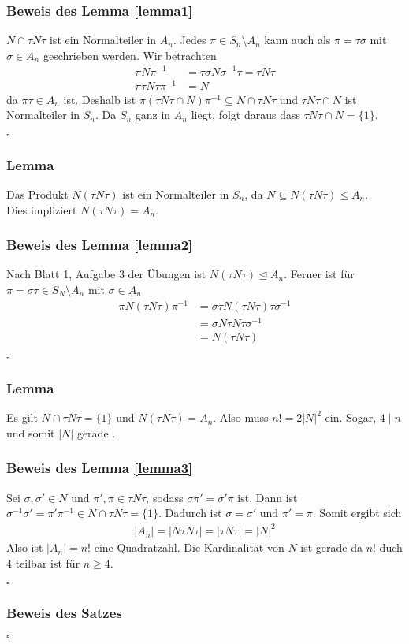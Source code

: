 \documentclass[12pt, german]{article}
\newcommand{\bewiesen}{

\begin{flushright}
		$\square$  \\
\end{flushright}}
\begin{document}
\subsubsection{Beweis des Lemma \ref{lemma1}}
		$N \cap \tau N \tau$ ist ein Normalteiler in $A_n$. Jedes $\pi \in S_n \setminus A_n$ kann auch als $\pi = \tau\sigma$ mit $\sigma \in A_n$ geschrieben werden.
		Wir betrachten 
		\begin{align*}
			\pi N \pi^{-1} &= \tau \sigma N \sigma^{-1} \tau = \tau N \tau  \\ 
			\pi \tau N \tau \pi^{-1} &= N
		\end{align*} 
		da $\pi\tau \in A_n$ ist. 
		Deshalb ist $\pi(\tau N \tau \cap N) \pi^{-1} \subseteq N \cap \tau N \tau$ und $\tau N \tau \cap N$ ist Normalteiler in $S_n$. Da $S_n$ ganz in $A_n$ liegt, folgt daraus dass $\tau N \tau \cap N = \{1\}$. 
		\bewiesen

\subsubsection{Lemma \label{lemma2}}
		Das Produkt $N(\tau N \tau)$ ist ein Normalteiler in $S_n$, da $N \subseteq N(\tau N \tau) \leq A_n$. \\ 
		Dies impliziert $N(\tau N \tau) = A_n$.
\subsubsection{Beweis des Lemma \ref{lemma2}}
		Nach Blatt 1, Aufgabe 3 der Übungen ist $N(\tau N \tau) \trianglelefteq A_n$. Ferner ist für $\pi = \sigma\tau \in S_N \setminus A_n$ mit $\sigma \in A_n$ 
		\begin{align*}
			\pi N(\tau N\tau) \pi^{-1} &= \sigma \tau N (\tau N \tau) \tau \sigma^{-1}  \\ 
			&= \sigma N \tau N \tau \sigma^{-1} \\
			&= N(\tau N \tau)
		\end{align*}
	\bewiesen

\subsubsection{Lemma \label{lemma3}}
	Es gilt $N\cap \tau N \tau =  \{1\}$ und $N(  \tau N \tau ) = A_n$. Also muss $n! = 2 |N|^2$ ein. Sogar, $4 \mid n$ und somit $|N|$ gerade . 
\subsubsection{Beweis des Lemma \ref{lemma3}}
Sei $\sigma, \sigma' \in N$ und $\pi', \pi \in \tau N \tau$, sodass $\sigma\pi' = \sigma'\pi$ ist. Dann ist $\sigma^{-1}\sigma' = \pi'\pi^{-1} \in N \cap \tau N \tau = \{1\}$. Dadurch ist $\sigma = \sigma'$ und $\pi' = \pi$. Somit ergibt sich 
\begin{align*}
	|A_n| = |N\tau N\tau| = |\tau N \tau| = |N|^2
\end{align*}
Also ist $|A_n| = n!$ eine Quadratzahl. Die Kardinalität von $N$ ist gerade da $n!$ duch $4$ teilbar ist für $n \geq 4$. 
\bewiesen

\subsubsection{Beweis des Satzes}

\bewiesen
\end{document}
